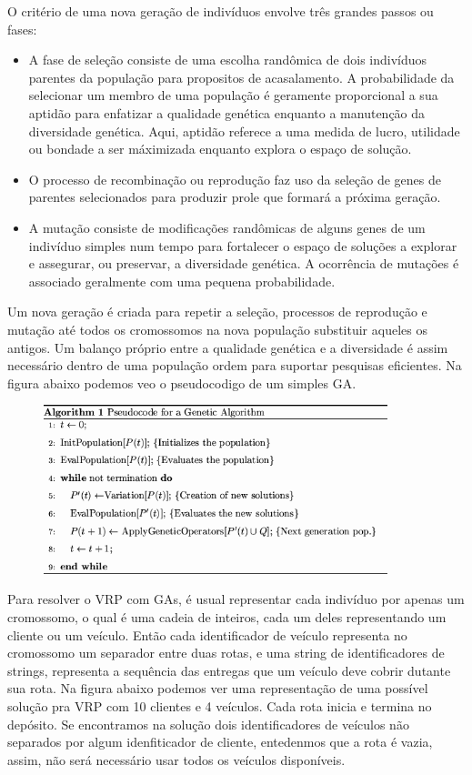  O critério de uma nova geração de indivíduos envolve três grandes passos ou fases:

\begin{itemize}
\item A fase de seleção consiste de uma escolha randômica de dois indivíduos parentes da população
para propositos de acasalamento. A probabilidade da selecionar um membro de uma população é
geramente proporcional a sua aptidão para enfatizar a qualidade genética enquanto a manutenção da
diversidade genética. Aqui, aptidão referece a uma medida de lucro, utilidade ou bondade a ser
máximizada enquanto explora o espaço de solução.
\item O processo de recombinação ou reprodução faz uso da seleção de genes de parentes selecionados
para produzir prole que formará a próxima geração.
\item A mutação consiste de modificações randômicas de alguns genes de um indivíduo simples num
tempo para fortalecer o espaço de soluções a explorar e assegurar, ou preservar, a diversidade
genética. A ocorrência de mutações é associado geralmente com uma pequena probabilidade.
\end{itemize}

 Um nova geração é criada para repetir a seleção, processos de reprodução e mutação até todos os
cromossomos na nova população substituir aqueles os antigos. Um balanço próprio entre a qualidade
genética e a diversidade é assim necessário dentro de uma população  ordem para suportar pesquisas
eficientes. Na figura abaixo podemos veo o pseudocodigo de um simples GA.

\begin{figure}[!ht]
\centering
\includegraphics[width=10cm]{fig/ga-pseudocode.png}
\end{figure}

 Para resolver o VRP com GAs, é usual representar cada indivíduo por apenas um cromossomo, o qual é
uma cadeia de inteiros, cada um deles representando um cliente ou um veículo. Então cada
identificador de veículo  representa no cromossomo um separador entre duas rotas, e uma string de
identificadores de strings, representa a sequência das entregas que um veículo deve cobrir dutante
sua rota. Na figura abaixo podemos ver uma representação de uma possível solução pra VRP com 10
clientes e 4 veículos. Cada rota inicia e termina no depósito. Se encontramos na solução dois
identificadores de veículos não separados por algum idenfiticador de cliente, entedenmos que a rota
é vazia, assim, não será necessário usar todos os veículos disponíveis.


